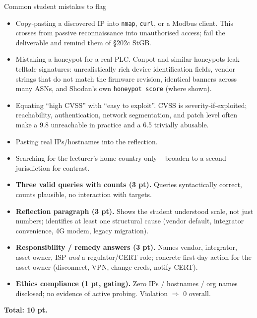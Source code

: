 \documentclass[11pt,a4paper]{article}
\begin{document}
\begin{solutionbox}{Common student mistakes to flag}
\begin{itemize}\setlength{\itemsep}{1pt}
  \item Copy-pasting a discovered IP into \texttt{nmap}, \texttt{curl}, or a Modbus client. This crosses from passive reconnaissance into unauthorised access; fail the deliverable and remind them of \S 202c StGB.
  \item Mistaking a honeypot for a real PLC. Conpot and similar honeypots leak telltale signatures: unrealistically rich device identification fields, vendor strings that do not match the firmware revision, identical banners across many ASNs, and Shodan's own \texttt{honeypot score} (where shown).
  \item Equating ``high CVSS'' with ``easy to exploit''. CVSS is severity-if-exploited; reachability, authentication, network segmentation, and patch level often make a 9.8 unreachable in practice and a 6.5 trivially abusable.
  \item Pasting real IPs/hostnames into the reflection.
  \item Searching for the lecturer's home country only -- broaden to a second jurisdiction for contrast.
\end{itemize}
\end{solutionbox}

\begin{rubricbox}
\begin{itemize}\setlength{\itemsep}{1pt}
  \item \textbf{Three valid queries with counts (3 pt).} Queries syntactically correct, counts plausible, no interaction with targets.
  \item \textbf{Reflection paragraph (3 pt).} Shows the student understood scale, not just numbers; identifies at least one structural cause (vendor default, integrator convenience, 4G modem, legacy migration).
  \item \textbf{Responsibility / remedy answers (3 pt).} Names vendor, integrator, asset owner, ISP \emph{and} a regulator/CERT role; concrete first-day action for the asset owner (disconnect, VPN, change creds, notify CERT).
  \item \textbf{Ethics compliance (1 pt, gating).} Zero IPs / hostnames / org names disclosed; no evidence of active probing. Violation $\Rightarrow$ 0 overall.
\end{itemize}
\textbf{Total: 10 pt.}
\end{rubricbox}
\end{document}
